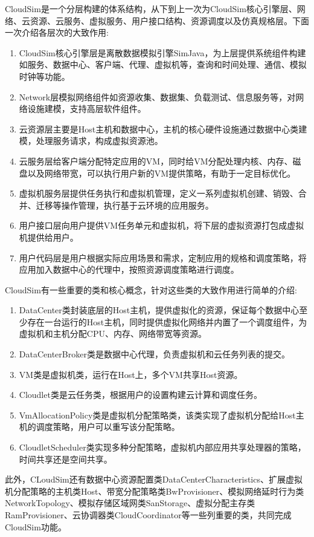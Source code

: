 CloudSim是一个分层构建的体系结构，从下到上一次为CloudSim核心引擎层、网络、云资源、云服务、虚拟服务、用户接口结构、资源调度以及仿真规格层。下面一次介绍各层次的大致作用:
\begin{enumerate}[(1).]
	\item CloudSim核心引擎层是离散数据模拟引擎SimJava，为上层提供系统组件构建如服务、数据中心、客户端、代理、虚拟机等，查询和时间处理、通信、模拟时钟等功能。
	\item Network层模拟网络组件如资源收集、数据集、负载测试、信息服务等，对网络设施建模，支持高层软件组件。
	\item 云资源层主要是Host主机和数据中心，主机的核心硬件设施通过数据中心类建模，处理服务请求，构成虚拟资源池。
	\item 云服务层给客户端分配特定应用的VM，同时给VM分配处理内核、内存、磁盘以及网络带宽，可以执行用户新的VM提供策略，有助于一定目标优化。
	\item 虚拟机服务层提供任务执行和虚拟机管理，定义一系列虚拟机创建、销毁、合并、迁移等操作管理，执行基于云环境的应用服务。
	\item 用户接口层向用户提供VM任务单元和虚拟机，将下层的虚拟资源打包成虚拟机提供给用户。
	\item 用户代码层是用户根据实际应用场景和需求，定制应用的规格和调度策略，将应用加入数据中心的代理中，按照资源调度策略进行调度。
\end{enumerate}
CloudSim有一些重要的类和核心概念，针对这些类的大致作用进行简单的介绍:
\begin{enumerate}[1.]
	\item DataCenter类封装底层的Host主机，提供虚拟化的资源，保证每个数据中心至少存在一台运行的Host主机，同时提供虚拟化网络并内置了一个调度组件，为虚拟机和主机分配CPU、内存、网络带宽等资源。
	\item DataCenterBroker类是数据中心代理，负责虚拟机和云任务列表的提交。
	\item VM类是虚拟机类，运行在Host上，多个VM共享Host资源。
	\item Cloudlet类是云任务类，根据用户的设置构建云计算和调度任务。
	\item VmAllocationPolicy类是虚拟机分配策略类，该类实现了虚拟机分配给Host主机的调度策略，用户可以重写该分配策略。
	\item CloudletScheduler类实现多种分配策略，虚拟机内部应用共享处理器的策略，时间共享还是空间共享。
\end{enumerate}

此外，CLoudSim还有数据中心资源配置类DataCenterCharacteristics、扩展虚拟机分配策略的主机类Host、带宽分配策略类BwProvisioner、模拟网络延时行为类NetworkTopology、模拟存储区域网类SanStorage、虚拟分配主存类RamProvisioner、云协调器类CloudCoordinator等一些列重要的类，共同完成CloudSim功能。

